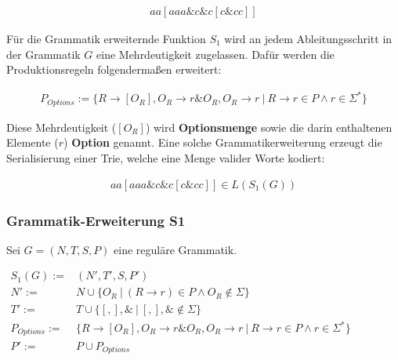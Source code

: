 \documentclass[a4paper,12pt]{report}
\begin{document}
\begin{eqnarray}
aa[aaa\&c\&c[c\&cc]]
\end{eqnarray}


Für die Grammatik erweiternde Funktion $S_1$ wird an jedem Ableitungsschritt in der Grammatik $G$ eine Mehrdeutigkeit zugelassen. Dafür werden die Produktionsregeln folgendermaßen erweitert:

\begin{eqnarray}
  P_{Options} := \{R \rightarrow [O_R], O_R \rightarrow r\& O_R, O_R \rightarrow r \ \vert\ R\rightarrow r\in P \land r\in \Sigma^*\}
\end{eqnarray}

Diese Mehrdeutigkeit ($[O_R]$) wird \textbf{Optionsmenge} sowie die darin enthaltenen Elemente ($r$) \textbf{Option} genannt. Eine solche Grammatikerweiterung erzeugt die Serialisierung einer Trie, welche eine Menge valider Worte kodiert:

\begin{eqnarray}
  aa[aaa\&c\&c[c\&cc]]\in L(S_1(G))
\end{eqnarray}

\subsubsection{Grammatik-Erweiterung S1}

Sei $G = (N,T,S,P)$ eine reguläre Grammatik.

$
\begin{array}{rl}
  S_1(G) :=& (N', T', S, P') \\
  N' :=& N \cup \{ O_R\ |\ (R\rightarrow r)\in P\land O_R \notin \Sigma\}\\
  T' :=& T \cup \{[ , ], \&\ |\ [,],\&\notin \Sigma \}\\
  P_{Options} :=& \{R \rightarrow [O_R], O_R \rightarrow r\& O_R, O_R \rightarrow r \ \vert\ R\rightarrow r\in P \land r\in \Sigma^*\} \\
  P' :=& P \cup P_{Options} 
\end{array}
$
\end{document}

